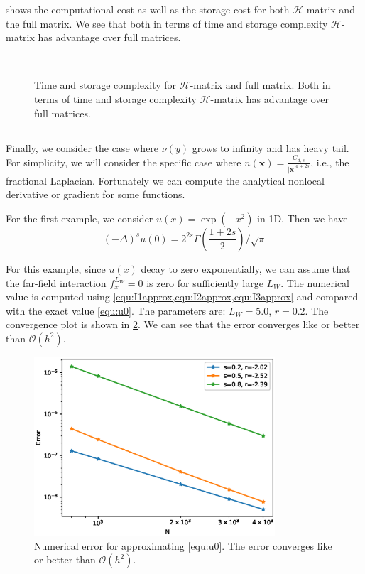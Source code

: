 \documentclass[10pt,a4paper]{article}
\newcommand{\bx}[0]{\mathbf{x}}
\theoremstyle{definition}
\begin{document}
 shows the computational cost as well as the storage cost for both $\mathcal{H}$-matrix and the full matrix. We see that both in terms of time and storage complexity $\mathcal{H}$-matrix has advantage over full matrices.

\begin{figure}[htpb]
\centering
\scalebox{0.3}{}~
\scalebox{0.3}{}

\caption{Time and storage complexity for $\mathcal{H}$-matrix and full matrix. Both in terms of time and storage complexity $\mathcal{H}$-matrix has advantage over full matrices.}
\label{fig:s}
\end{figure}

\subsection{}

Finally, we consider the case where $\nu(y)$ grows to infinity and has heavy tail. For simplicity, we will consider the specific case where $n(\bx) = \frac{C_{d, s}}{|\bx|^{d+2s}}$, i.e., the fractional Laplacian. Fortunately we can compute  the analytical nonlocal derivative or gradient for some functions. 

For the first example, we consider $u(x)=\exp(-x^2)$ in 1D. Then we have
\begin{equation}\label{equ:u0}
	(-\Delta)^s u(0) = 2^{2s}\Gamma\left( \frac{1+2s}{2} \right)/\sqrt{\pi}
\end{equation}

For this example, since $u(x)$ decay to zero exponentially, we can assume that the far-field interaction $f^{L_W}_x=0$ is zero for sufficiently large $L_W$. The numerical value is computed using \cref{equ:I1approx,equ:I2approx,equ:I3approx} and compared with the exact value \cref{equ:u0}. The parameters are: $L_W=5.0$, $r=0.2$. The convergence plot is shown in \cref{fig:fig5}. We can see that the error converges like or better than $\mathcal{O}(h^2)$. 

\begin{figure}[H] %
\centering
\includegraphics[width=0.8\textwidth,keepaspectratio]{figures/fig5}
\caption{Numerical error for approximating \cref{equ:u0}. The error converges like or better than $\mathcal{O}(h^2)$.}
\label{fig:fig5}
\end{figure}
\end{document}
